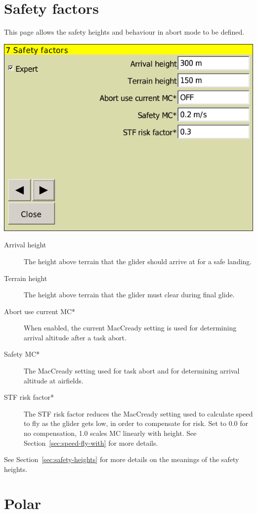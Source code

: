 \documentclass[a4paper,12pt]{refrep}
\begin{document}
\section{Safety factors}

This page allows the safety heights and behaviour in abort mode to be defined.

\begin{center}
\includegraphics[angle=0,width=0.8\linewidth,keepaspectratio='true']{figures/config-safety.png}
\end{center}

\begin{description}
\item[Arrival height]  The height above terrain that the glider
  should arrive at for a safe landing.
\item[Terrain height] The height above terrain that the glider must
  clear during final glide.
\item[Abort use current MC*]  When enabled, the current MacCready setting
  is used for determining arrival altitude after a task abort.
\item[Safety MC*]  The MacCready setting used for task abort and
  for determining arrival altitude at airfields. 
\item[STF risk factor*] 
  The STF risk factor reduces the MacCready setting used to calculate
  speed to fly as the glider gets low, in order to compensate for
  risk.  Set to 0.0 for no compensation, 1.0 scales MC linearly with
  height.  See Section~\ref{sec:speed-fly-with} for more details.
\end{description}
See Section~\ref{sec:safety-heights} for more details on the meanings
of the safety heights.


\clearpage
\section{Polar}
\end{document}

